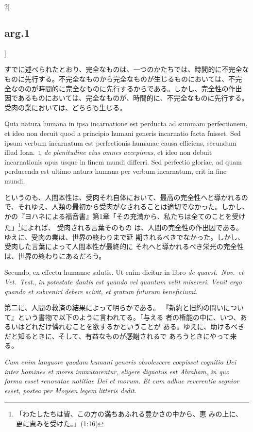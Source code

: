 \documentclass[paper=a4paper,fontsize=10pt,jafontsize=9pt,titlepage]{jlreq}
\begin{document}
\begin{paracol}{2}[\subsection{arg.1}]
\switchcolumn

すでに述べられたとおり、完全なものは、一つのかたちでは、時間的に不完全な
 ものに先行する。不完全なものから完全なものが生じるものにおいては、不完
 全なののが時間的に完全なものに先行するからである。しかし、完全性の作出
 因であるものにおいては、完全なものが、時間的に、不完全なものに先行する。
受肉の業においては、どちらも生じる。

\switchcolumn*

Quia
natura humana in ipsa incarnatione est perducta ad summam perfectionem,
et ideo non decuit quod a principio humani generis incarnatio facta
fuisset. Sed ipsum verbum incarnatum est perfectionis humanae causa
efficiens, secundum illud Ioan.~{\scshape i}, {\itshape de plenitudine eius omnes accepimus},
et ideo non debuit incarnationis opus usque in finem mundi differri. Sed
perfectio gloriae, ad quam perducenda est ultimo natura humana per
verbum incarnatum, erit in fine mundi.

\switchcolumn

というのも、人間本性は、受肉それ自体において、最高の完全性へと導かれるの
 で、それゆえ、人類の最初から受肉がなされることは適切でなかった。しかし、
 かの『ヨハネによる福音書』第1章「その充満から、私たちは全てのことを受け
 た」\footnote{「わたしたちは皆、この方の満ちあふれる豊かさの中から、恵
 みの上に、更に恵みを受けた。」(1:16)}によれば、 受肉される言葉そのもの
 は、人間の完全性の作出因である。ゆえに、受肉の業は、世界の終わりまで延
 期されるべきでなかった。しかし、受肉した言葉によって人間本性が最終的に
 それへと導かれるべき栄光の完全性は、世界の終わりにあるだろう。

\switchcolumn*

Secundo, ex effectu humanae
salutis. Ut enim dicitur in libro {\itshape de quaest.~Nov.~et Vet.~Test}., {\itshape in
potestate dantis est quando vel quantum velit misereri. Venit ergo
quando et subveniri debere scivit, et gratum futurum beneficiumi}.

\switchcolumn

第二に、人間の救済の結果によって明らかである。
『新約と旧約の問いについて』という書物で以下のように言われてる。「与える
 者の権能の中に、いつ、あるいはどれだけ憐れむことを欲するかということが
 ある。ゆえに、助けるべきだと知るときに、そして、有益なものが感謝されるで
 あろうときにやって来る。

\switchcolumn*

{\itshape Cum
enim languore quodam humani generis obsolescere coepisset cognitio Dei
inter homines et mores immutarentur, eligere dignatus est Abraham, in
quo forma esset renovatae notitiae Dei et morum. Et cum adhuc reverentia
segnior esset, postea per Moysen legem litteris dedit. 
}


\end{paracol}
\end{document}
